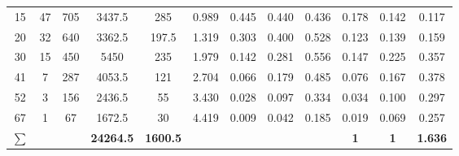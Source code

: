 \begin{table}[htbp]
{\begin{tabular}{cccccccccccc}
            \rowcolor{blue!20} 15               & 47             & 705                   & 3437.5                      & 285                       & 0.989             & 0.445        & 0.440                    & 0.436                      & 0.178                        & 0.142                               & 0.117                                 \\
            \rowcolor{red!20} 20                & 32             & 640                   & 3362.5                      & 197.5                     & 1.319             & 0.303        & 0.400                    & 0.528                      & 0.123                        & 0.139                               & 0.159                                 \\
            30                                  & 15             & 450                   & 5450                        & 235                       & 1.979             & 0.142        & 0.281                    & 0.556                      & 0.147                        & 0.225                               & 0.357                                 \\
            41                                  & 7              & 287                   & 4053.5                      & 121                       & 2.704             & 0.066        & 0.179                    & 0.485                      & 0.076                        & 0.167                               & 0.378                                 \\
            52                                  & 3              & 156                   & 2436.5                      & 55                        & 3.430             & 0.028        & 0.097                    & 0.334                      & 0.034                        & 0.100                               & 0.297                                 \\
            67                                  & 1              & 67                    & 1672.5                      & 30                        & 4.419             & 0.009        & 0.042                    & 0.185                      & 0.019                        & 0.069                               & 0.257                                 \\ \midrule
            \rowcolor{green!15} \textbf{$\sum$} &                &                       & \textbf{24264.5}            & \textbf{1600.5}           &                   &              &                          &                            & \textbf{1}                   & \textbf{1}                          & \textbf{1.636}                        \\ \bottomrule
        \end{tabular}
    }
\end{table}

